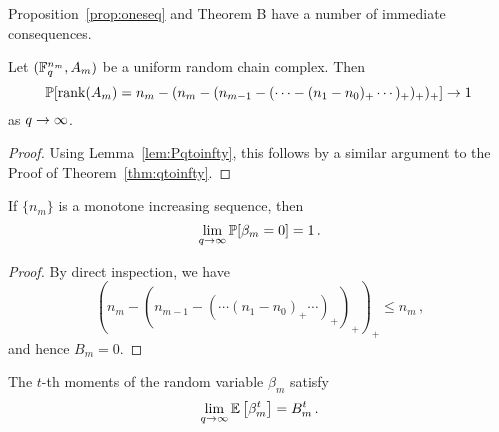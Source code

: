 Proposition~\ref{prop:oneseq} and Theorem B have a number of immediate consequences.

\begin{corollary}
  Let $(\mathbb{F}_q^{n_m},A_m)$ be a uniform random chain complex. Then
  \[
    \mathbb{P}[\operatorname{\mathrm{rank}}(A_m) = n_m-(n_m-(n_{m-1} -( \cdots -(n_1-n_0)_+ \cdots )_+ )_+)_+]
    \rightarrow 1 \,
  \]
  as $q \rightarrow \infty$.
\end{corollary}

\begin{proof}
  Using Lemma~\ref{lem:Pqtoinfty}, this follows by a similar argument to the
  Proof of Theorem~\ref{thm:qtoinfty}.
\end{proof}

\begin{corollary}
  \label{cor:inc}
  If $\{n_m\}$ is a monotone increasing sequence, then 
  \[
    \lim_{q \rightarrow \infty} \mathbb{P}[\beta_m = 0] = 1 \, .
  \]
\end{corollary}

\begin{proof}
  By direct inspection, we have
  \[
    (n_m - (n_{m-1} - ( \cdots (n_1 - n_0)_+ \cdots )_+)_+)_+ \leq n_m \, ,
  \]
  and hence $B_m = 0$.
\end{proof}

\begin{corollary}
  The $t$-th moments of the random variable $\beta_m$ satisfy
  \[
    \lim_{q \rightarrow \infty} \mathbb{E}\left[\beta_m^t \right] = B_m^t \, .
  \]
\end{corollary}


